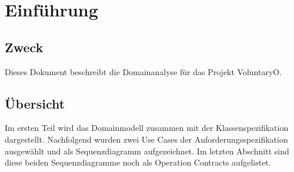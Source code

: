 \chapter{Einführung}
	\section{Zweck}
	Dieses Dokument beschreibt die Domainanalyse für das Projekt VoluntaryO.
	
	
	\section{Übersicht}
	Im ersten Teil wird das Domainmodell zusammen mit der Klassenspezifikation dargestellt. Nachfolgend wurden zwei Use Cases der Anforderungsspezifikation ausgewählt und als Sequenzdiagramm aufgezeichnet. Im letzten Abschnitt sind diese beiden Sequenzdiagramme noch als Operation Contracts aufgelistet.